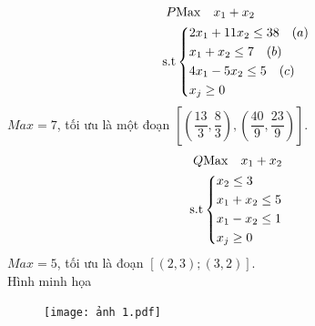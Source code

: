 \documentclass[12pt,a4paper]{report}
\begin{document}
  
   \begin{equation}
     \begin{split}
       P   & {\rm{Max}}\quad x_1 +x_2\\
          \rm{s.t} &\left\{\begin{split}
            & 2x_1+11x_2 \le 38 \quad  (a)\\
            &x_1+x_2 \le 7  \quad (b)\\
            &4x_1-5x_2 \le 5 \quad (c)\\
           & x_j \ge 0\\
           \end{split}\right.
       \end{split}
   \end{equation}
   $Max=7$, tối ưu là một đoạn $[(\dfrac{13}{3},\dfrac{8}{3}),(\dfrac{40}{9},\dfrac{23}{9})]$.\\

   
   \begin{equation}
     \begin{split}
        Q  & {\rm{Max}} \quad x_1 +x_2\\
          \rm{s.t} &\left\{\begin{split}
            & x_2 \le 3\\
            &x_1+x_2 \le 5\\
            &x_1 -x_2 \le 1\\
           & x_j \ge 0\\
           \end{split}\right.
       \end{split}
   \end{equation}
   $Max=5$, tối ưu là đoạn $[(2,3);(3,2)]$.\\
Hình minh họa
\begin{figure}[h]
\centering
\texttt{[image: ảnh 1.pdf]}
\end{figure}    
\end{document}
